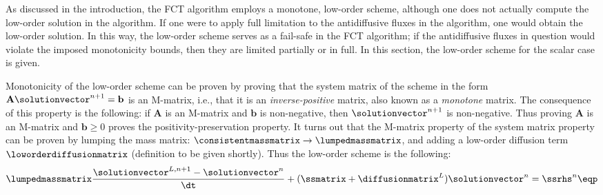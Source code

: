 As discussed in the introduction, the FCT algorithm employs a monotone,
low-order scheme, although one does not actually compute the low-order
solution in the algorithm. If one were to apply full limitation to
the antidiffusive fluxes in the algorithm, one would obtain the low-order
solution. In this way, the low-order scheme serves as a fail-safe in the FCT
algorithm; if the antidiffusive fluxes in question would violate the imposed
monotonicity bounds, then they are limited partially or in full. In this section,
the low-order scheme for the scalar case is given.

Monotonicity of the low-order
scheme can be proven by proving that the system matrix of the scheme in
the form $\mathbf{A}\solutionvector^{n+1}=\mathbf{b}$ is an M-matrix, i.e.,
that it is an \emph{inverse-positive} matrix, also known as a \emph{monotone}
matrix. The consequence of this property
is the following: if $\mathbf{A}$ is an M-matrix and $\mathbf{b}$ is
non-negative, then $\solutionvector^{n+1}$ is non-negative. Thus proving
$\mathbf{A}$ is an M-matrix and $\mathbf{b}\geq 0$ proves the
positivity-preservation property. It turns out that the M-matrix
property of the system matrix property can be proven by
lumping the mass matrix:
$\consistentmassmatrix\rightarrow\lumpedmassmatrix$,
and adding a low-order diffusion term
$\loworderdiffusionmatrix$ (definition to be given shortly).
Thus the low-order scheme is the following:
\begin{equation}
  \lumpedmassmatrix\frac{\solutionvector^{L,n+1}-\solutionvector^n}{\dt}
    + (\ssmatrix + \diffusionmatrix^L)\solutionvector^n = \ssrhs^n \eqp
\end{equation}

